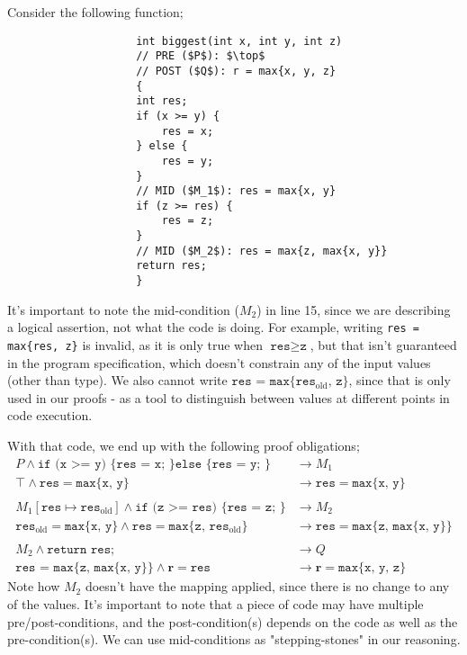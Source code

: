 \documentclass[a4paper, 12pt]{article}
\begin{document}
                Consider the following function;
                \begin{lstlisting}
                    int biggest(int x, int y, int z)
                    // PRE ($P$): $\top$
                    // POST ($Q$): r = max{x, y, z}
                    {
                    int res;
                    if (x >= y) {
                        res = x;
                    } else {
                        res = y;
                    }
                    // MID ($M_1$): res = max{x, y}
                    if (z >= res) {
                        res = z;
                    }
                    // MID ($M_2$): res = max{z, max{x, y}}
                    return res;
                    }
                \end{lstlisting}
                It's important to note the mid-condition ($M_2$) in line 15, since we are describing a logical assertion, not what the code is doing. For example, writing \texttt{res = max\{res, z\}} is invalid, as it is only true when $\texttt{res} \geq \texttt{z}$, but that isn't guaranteed in the program specification, which doesn't constrain any of the input values (other than type). We also cannot write $\texttt{res = max\{}\texttt{res}_\text{old}\texttt{, z\}}$, since that is only used in our proofs - as a tool to distinguish between values at different points in code execution.
                \medskip

                With that code, we end up with the following proof obligations;
                \begin{align*}
                    P \land \texttt{if (x >= y) \{ res = x; \} else \{ res = y; \}} & \rightarrow M_1 \\
                    \top \land \texttt{res} = \texttt{max\{x, y\}} & \rightarrow \texttt{res} = \texttt{max\{x, y\}} \\ \\
                    M_1[\texttt{res} \mapsto \texttt{res}_\text{old}] \land \texttt{if (z >= res) \{ res = z; \}} & \rightarrow M_2 \\
                    \texttt{res}_\text{old} = \texttt{max\{x, y\}} \land \texttt{res} = \texttt{max\{z, }\texttt{res}_\text{old}\texttt{\}} & \rightarrow \texttt{res} = \texttt{max\{z, max\{x, y\}\}} \\ \\
                    M_2 \land \texttt{return res;} & \rightarrow Q \\
                    \texttt{res = max\{z, max\{x, y\}\}} \land \textbf{r} = \texttt{res} & \rightarrow \textbf{r} = \texttt{max\{x, y, z\}}
                \end{align*}
                Note how $M_2$ doesn't have the mapping applied, since there is no change to any of the values. It's important to note that a piece of code may have multiple pre/post-conditions, and the post-condition(s) depends on the code as well as the pre-condition(s). We can use mid-conditions as "stepping-stones" in our reasoning.
\end{document}
